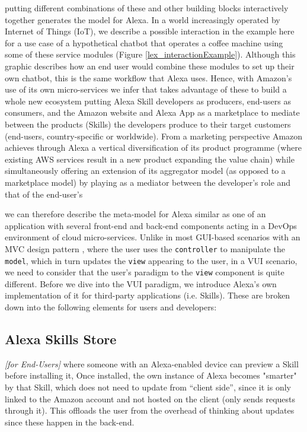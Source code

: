 putting different combinations of these and other building blocks interactively together generates the model for Alexa. In a world increasingly operated by Internet of Things (IoT), we describe a possible interaction in the example here for a use case of a hypothetical chatbot that operates a coffee machine using some of these service modules (Figure \ref{lex_interactionExample}).  Although this graphic describes how an end user would combine these modules to set up their own chatbot, this is the same workflow that Alexa uses. Hence, with Amazon's use of its own micro-services we infer that takes advantage of these to build a whole new ecosystem putting Alexa Skill developers as producers, end-users as consumers, and the Amazon website and Alexa App as a marketplace to mediate between the products (Skills) the developers produce to their target customers (end-users, country-specific or worldwide). From a marketing perspective Amazon achieves through Alexa a vertical diversification of its product programme (where existing AWS services result in a new product expanding the value chain) while simultaneously offering an extension of its aggregator model (as opposed to a marketplace model)%
 by playing as a mediator between the developer's role and that of the end-user's %




we can therefore describe the meta-model for Alexa similar as one %
of an application with several front-end and back-end components acting in a DevOps environment of cloud micro-services. Unlike in most GUI-based scenarios with an MVC design pattern \cite{wiki:mvc}, where the user uses the \texttt{controller} to manipulate the \texttt{model}, which in turn updates the \texttt{view} appearing to the user, in a VUI scenario, we need to consider that the user's paradigm to the \texttt{view} component is quite different. Before we dive into the VUI paradigm, we introduce Alexa's own implementation of it for third-party applications (i.e. Skills). These are broken down into the following elements for users and developers: %



	
	\subsection*{Alexa Skills Store} \textit{[for End-Users]} where someone with an Alexa-enabled device can preview a Skill before installing it, %
	Once installed, the own instance of Alexa becomes "smarter" by that Skill, which does not need to update from ``client side'', since it is only linked to the Amazon account and not hosted on the client (only sends requests through it).  %
	This offloads the user from the overhead of %
	thinking about updates since these happen in the back-end. 
	
